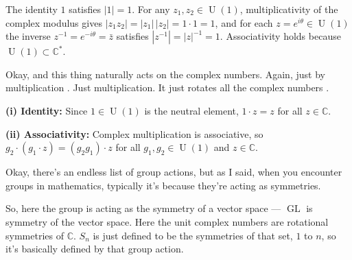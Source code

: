 \begin{content}
\begin{steps}
The identity $1$ satisfies $|1| = 1$. For any $z_1, z_2 \in \operatorname{U}(1)$, multiplicativity of the complex modulus gives $|z_1 z_2| = |z_1|\,|z_2| = 1 \cdot 1 = 1$, and for each $z = e^{i\theta} \in \operatorname{U}(1)$ the inverse $z^{-1} = e^{-i\theta} = \bar{z}$ satisfies $|z^{-1}| = |z|^{-1} = 1$. Associativity holds because $\operatorname{U}(1) \subset \mathbb{C}^*$.
\end{steps}
\end{content}

\begin{speech}[01:01:30 - 01:01:49]
Okay, and this thing naturally acts on the complex numbers. Again, just by multiplication . Just multiplication. It just rotates all the complex numbers .
\end{speech}

\begin{content}

\begin{steps}
\textbf{(i) Identity:} Since $1 \in \operatorname{U}(1)$ is the neutral element, $1 \cdot z = z$ for all $z \in \mathbb{C}$.

\textbf{(ii) Associativity:} Complex multiplication is associative, so $g_2 \cdot (g_1 \cdot z) = (g_2 g_1) \cdot z$ for all $g_1, g_2 \in \operatorname{U}(1)$ and $z \in \mathbb{C}$.
\end{steps}
\end{content}

\begin{speech}[01:01:50 - 01:02:17]
Okay, there's an endless list of group actions, but as I said, when you encounter groups in mathematics, typically it's because they're acting as symmetries.

So, here  the group is acting as the symmetry of a vector space --- $\operatorname{GL}$ is symmetry of the vector space. Here  the unit complex numbers are rotational symmetries of $\mathbb{C}$. $S_n$  is just defined to be the symmetries of that set, $1$ to $n$, so it's basically defined by that group action.
\end{speech}

